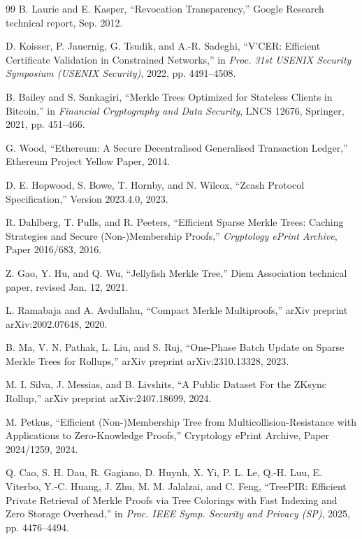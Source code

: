 \begin{thebibliography}{99}
B. Laurie and E. Kasper,
\newblock ``Revocation Transparency,''
\newblock Google Research technical report, Sep. 2012.

D. Koisser, P. Jauernig, G. Tsudik, and A.-R. Sadeghi,
\newblock ``V'CER: Efficient Certificate Validation in Constrained Networks,''
\newblock in \emph{Proc. 31st USENIX Security Symposium (USENIX Security)}, 2022, pp. 4491--4508.

B. Bailey and S. Sankagiri,
\newblock ``Merkle Trees Optimized for Stateless Clients in Bitcoin,''
\newblock in \emph{Financial Cryptography and Data Security}, LNCS 12676, Springer, 2021, pp. 451--466.

G. Wood,
\newblock ``Ethereum: A Secure Decentralised Generalised Transaction Ledger,''
\newblock Ethereum Project Yellow Paper, 2014.

D. E. Hopwood, S. Bowe, T. Hornby, and N. Wilcox,
\newblock ``Zcash Protocol Specification,''
\newblock Version 2023.4.0, 2023.

R. Dahlberg, T. Pulls, and R. Peeters,
\newblock ``Efficient Sparse Merkle Trees: Caching Strategies and Secure (Non-)Membership Proofs,''
\newblock \emph{Cryptology ePrint Archive}, Paper 2016/683, 2016.

Z. Gao, Y. Hu, and Q. Wu,
\newblock ``Jellyfish Merkle Tree,''
\newblock Diem Association technical paper, revised Jan. 12, 2021.

L. Ramabaja and A. Avdullahu,
\newblock ``Compact Merkle Multiproofs,''
\newblock arXiv preprint arXiv:2002.07648, 2020.

B. Ma, V. N. Pathak, L. Liu, and S. Ruj,
\newblock ``One-Phase Batch Update on Sparse Merkle Trees for Rollups,''
\newblock arXiv preprint arXiv:2310.13328, 2023.

M. I. Silva, J. Messias, and B. Livshits,
\newblock ``A Public Dataset For the ZKsync Rollup,''
\newblock arXiv preprint arXiv:2407.18699, 2024.

M. Petkus,
\newblock ``Efficient (Non-)Membership Tree from Multicollision-Resistance with Applications to Zero-Knowledge Proofs,''
\newblock Cryptology ePrint Archive, Paper 2024/1259, 2024.

Q. Cao, S. H. Dau, R. Gagiano, D. Huynh, X. Yi, P. L. Le, Q.-H. Luu, E. Viterbo, Y.-C. Huang, J. Zhu, M. M. Jalalzai, and C. Feng,
\newblock ``TreePIR: Efficient Private Retrieval of Merkle Proofs via Tree Colorings with Fast Indexing and Zero Storage Overhead,''
\newblock in \emph{Proc. IEEE Symp. Security and Privacy (SP)}, 2025, pp. 4476--4494.


\end{thebibliography}
